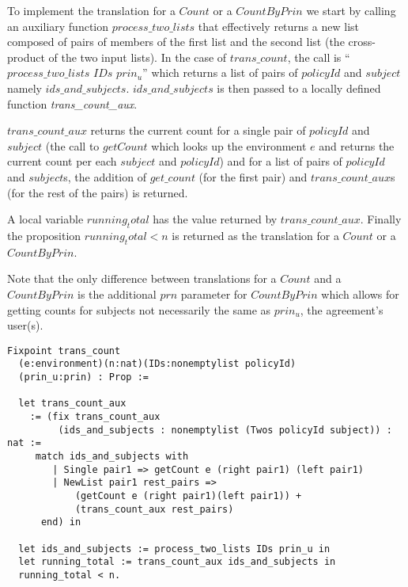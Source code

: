 To implement the translation for a $Count$ or a $CountByPrin$ we start by calling an auxiliary function $process\_two\_lists$ that effectively returns a new list composed of pairs of members of the first list and the second list (the cross-product of the two input lists). In the case of $trans\_count$, the call is ``$process\_two\_lists$ $IDs$ $prin_u$'' which returns a list of pairs of $policyId$ and $subject$ namely $ids\_and\_subjects$. $ids\_and\_subjects$ is then passed to a locally defined function \emph{trans_count_aux}.

$trans\_count\_aux$ returns the current count for a single pair of $policyId$ and $subject$ (the call to $getCount$ which looks up the environment $e$ and returns the current count per each $subject$ and $policyId$) and for a list of pairs of $policyId$ and $subject$s, the addition of $get\_count$ (for the first pair) and $trans\_count\_aux$s (for the rest of the pairs) is returned. 

A local variable $running_total$ has the value returned by $trans\_count\_aux$. Finally the proposition $running_total < n$ is returned as the translation for a $Count$ or a $CountByPrin$.

Note that the only difference between translations for a $Count$ and a $CountByPrin$ is the additional $prn$ parameter for $CountByPrin$ which allows for getting counts for subjects not necessarily the same as $prin_{u}$, the agreement's user(s).

\begin{minipage}[c]{0.95\textwidth}
\begin{lstlisting}
Fixpoint trans_count 
  (e:environment)(n:nat)(IDs:nonemptylist policyId)
  (prin_u:prin) : Prop := 

  let trans_count_aux 
    := (fix trans_count_aux
         (ids_and_subjects : nonemptylist (Twos policyId subject)) : nat :=
     match ids_and_subjects with
        | Single pair1 => getCount e (right pair1) (left pair1)
        | NewList pair1 rest_pairs =>
            (getCount e (right pair1)(left pair1)) +
            (trans_count_aux rest_pairs)
      end) in
  
  let ids_and_subjects := process_two_lists IDs prin_u in
  let running_total := trans_count_aux ids_and_subjects in
  running_total < n.
\end{lstlisting}
\end{minipage}